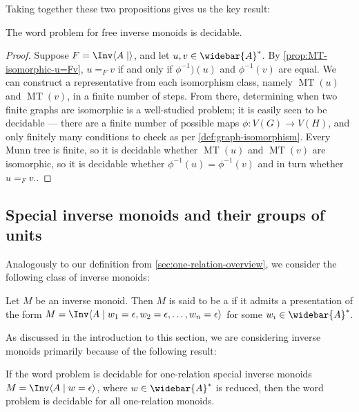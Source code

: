 \documentclass[noindex,noinsetproof,12pt]{lmaths}
\newcommand{\Abar}{\widebar{A}}
\DeclareMathOperator{\MT}{MT}
\begin{document}
\begin{comment}
\begin{theorem} \label{thm:equal-FIM-iff-Munn-isomorphic}
	Let $u, v \in F = \Inv \langle A\mid\rangle$. Then $u =_F v$ if and only if $\MT(u)$ and $\MT(v)$ are isomorphic as birooted trees, i.e. they are isomorphic as graphs and vertices labelled $\alpha$ and $\beta$ in $\MT(u)$ have their images labelled $\alpha$ and $\beta$ in $\MT(v)$ under $\phi$.
\end{theorem}
\end{comment}

Taking together these two propositions gives us the key result:

\begin{theorem}
	The word problem for free inverse monoids is decidable.
\end{theorem}
\begin{proof}
	Suppose $F = \Inv \langle A \mid\rangle$, and let $u, v \in \Abar^*$. By \cref{prop:MT-isomorphic-u=Fv}, $u =_F v$ if and only if $\phi^{-1})(u)$ and $\phi^{-1}(v)$ are equal. We can construct a representative from each isomorphism class, namely $\MT(u)$ and $\MT(v)$, in a finite number of steps. From there, determining when two finite graphs are isomorphic is a well-studied problem; it is easily seen to be decidable --- there are a finite number of possible maps $\phi : V(G) \to V(H)$, and only finitely many conditions to check as per \cref{def:graph-isomorphism}. Every Munn tree is finite, so it is decidable whether $\MT(u)$ and $\MT(v)$ are isomorphic, so it is decidable whether $\phi^{-1}(u) = \phi^{-1}(v)$ and in turn whether $u =_F v$..
\end{proof}

\subsection{Special inverse monoids and their groups of units}

Analogously to our definition from \cref{sec:one-relation-overview}, we consider the following class of inverse monoids:
\begin{defn}
	Let $M$ be an inverse monoid. Then $M$ is said to be a  if it admits a presentation of the form $M = \Inv \langle A \mid w_1 = \epsilon, w_2 = \epsilon, \ldots, w_n = \epsilon \rangle$ for some $w_i \in \Abar^*$.
\end{defn}

As discussed in the introduction to this section, we are considering inverse monoids primarily because of the following result:
\begin{theorem}
	If the word problem is decidable for one-relation special inverse monoids $M = \Inv \langle A \mid w = \epsilon\rangle$, where $w \in \Abar^*$ is reduced, then the word problem is decidable for all one-relation monoids.
\end{theorem}
\end{document}
